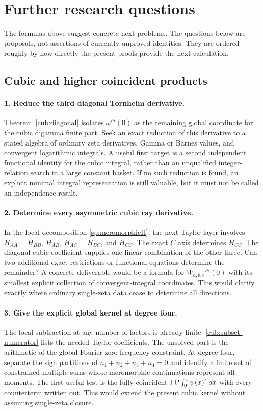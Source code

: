 \section{Further research questions}
\label{future:sec}

The formulas above suggest concrete next problems. The questions below
are proposals, not assertions of currently unproved identities.
They are ordered roughly by how directly the present proofs provide
the next calculation.

\subsection{Cubic and higher coincident products}

\paragraph{1. Reduce the third diagonal Tornheim derivative.}
Theorem~\ref{cub:diagonal} isolates $\omega'''(0)$ as the remaining
global coordinate for the cubic digamma finite part. Seek an exact
reduction of this derivative to a stated algebra of ordinary zeta
derivatives, Gamma or Barnes values, and convergent logarithmic
integrals. A useful first target is a second independent functional
identity for the cubic integral, rather than an unqualified
integer-relation search in a large constant basket.
If no such reduction is found, an explicit minimal integral
representation is still valuable, but it must not be called an
independence result.

\paragraph{2. Determine every asymmetric cubic ray derivative.}
In the local decomposition \eqref{sp:meromorphicH}, the next Taylor
layer involves $H_{AA}=H_{BB}$, $H_{AB}$, $H_{AC}=H_{BC}$, and
$H_{CC}$. The exact $C$ axis determines $H_{CC}$.
The diagonal cubic coefficient supplies one linear combination of
the other three. Can two additional exact restrictions or functional
equations determine the remainder? A concrete deliverable would be
a formula for $W_{a,b,c}'''(0)$ with its smallest explicit collection
of convergent-integral coordinates. This would clarify exactly where
ordinary single-zeta data cease to determine all directions.

\paragraph{3. Give the explicit global kernel at degree four.}
The local subtraction at any number of factors is already finite:
\eqref{cub:subset-numerator} lists the needed Taylor coefficients.
The unsolved part is the arithmetic of the global Fourier
zero-frequency constraint. At degree four, separate the sign
partitions of $n_1+n_2+n_3+n_4=0$ and identify a finite set of
constrained multiple sums whose meromorphic continuations represent
all moments. The first useful test is the fully coincident
$\operatorname*{FP}\int_0^1\psi(x)^4\,dx$ with every counterterm written out.
This would extend the present cubic kernel without assuming
single-zeta closure.

